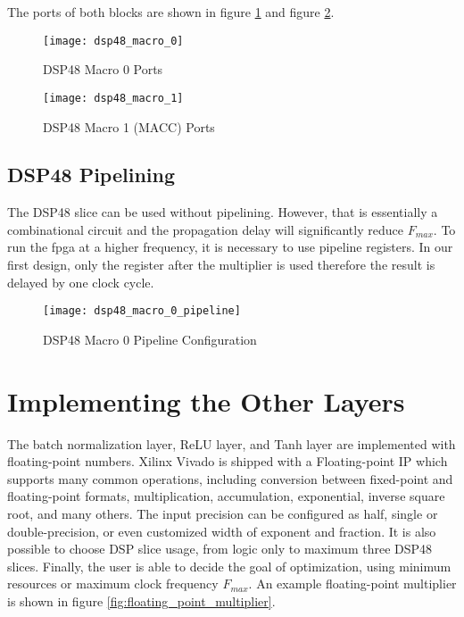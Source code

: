 The ports of both blocks are shown in figure \ref{fig:dsp48_macro_0} and figure \ref{fig:dsp48_macro_1}.

\begin{figure}[h]
  \centering
  \texttt{[image: dsp48\_macro\_0]}
  \caption{DSP48 Macro 0 Ports}
  \label{fig:dsp48_macro_0}
\end{figure}

\begin{figure}[h]
  \centering
  \texttt{[image: dsp48\_macro\_1]}
  \caption{DSP48 Macro 1 (MACC) Ports}
  \label{fig:dsp48_macro_1}
\end{figure}

\subsection{DSP48 Pipelining}

The DSP48 slice can be used without pipelining. However, that is essentially a combinational circuit and
the propagation delay will significantly reduce $F_{max}$. To run the \gls{fpga} at a higher frequency, it is
necessary to use pipeline registers. In our first design, only the register after the multiplier is used
therefore the result is delayed by one clock cycle.

\begin{figure}[h]
  \centering
  \texttt{[image: dsp48\_macro\_0\_pipeline]}
  \caption{DSP48 Macro 0 Pipeline Configuration}
  \label{fig:dsp48_macro_0_pipeline}
\end{figure}

\section{Implementing the Other Layers}

The batch normalization layer, ReLU layer, and Tanh layer are implemented with floating-point numbers.
Xilinx Vivado is shipped with a Floating-point IP which supports many common operations, including
conversion between fixed-point and floating-point formats, multiplication, accumulation, exponential,
inverse square root, and many others. The input precision can be configured as half, single or
double-precision, or even customized width of exponent and fraction. It is also possible to choose
DSP slice usage, from logic only to maximum three DSP48 slices. Finally, the user is able to decide
the goal of optimization, using minimum resources or maximum clock frequency $F_{max}$. An example
floating-point multiplier is shown in figure \ref{fig:floating_point_multiplier}.

